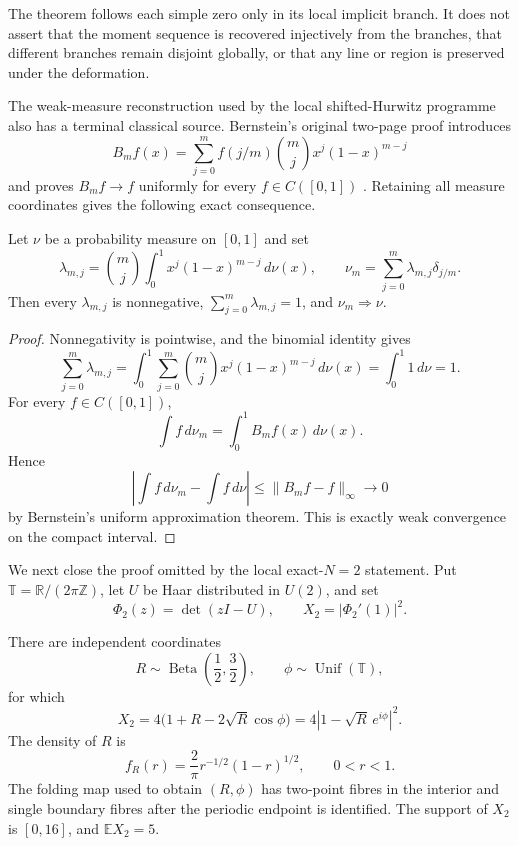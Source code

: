 The theorem follows each simple zero only in its local implicit branch.  It does not assert
that the moment sequence is recovered injectively from the branches, that different branches
remain disjoint globally, or that any line or region is preserved under the deformation.

The weak-measure reconstruction used by the local shifted-Hurwitz programme also has a
terminal classical source.  Bernstein's original two-page proof introduces
\[
 B_mf(x)=\sum_{j=0}^{m}f(j/m)\binom mjx^j(1-x)^{m-j}
\]
and proves $B_mf\to f$ uniformly for every $f\in C([0,1])$
\cite[eqs.~(1)--(5)]{bernstein1912}.  Retaining all measure coordinates gives the following
exact consequence.

\begin{proposition}
\label{prop:bernstein-measure-reconstruction}
Let $\nu$ be a probability measure on $[0,1]$ and set
\[
 \lambda_{m,j}=\binom mj\int_0^1x^j(1-x)^{m-j}\,d\nu(x),
 \qquad
 \nu_m=\sum_{j=0}^{m}\lambda_{m,j}\delta_{j/m}.
\]
Then every $\lambda_{m,j}$ is nonnegative,
$\sum_{j=0}^{m}\lambda_{m,j}=1$, and $\nu_m\Rightarrow\nu$.
\end{proposition}
\begin{proof}
Nonnegativity is pointwise, and the binomial identity gives
\[
 \sum_{j=0}^{m}\lambda_{m,j}
 =\int_0^1\sum_{j=0}^{m}\binom mjx^j(1-x)^{m-j}\,d\nu(x)
 =\int_0^1 1\,d\nu=1.
\]
For every $f\in C([0,1])$,
\[
 \int f\,d\nu_m
 =\int_0^1 B_mf(x)\,d\nu(x).
\]
Hence
\[
 \left|\int f\,d\nu_m-\int f\,d\nu\right|
 \le \lVert B_mf-f\rVert_\infty\longrightarrow0
\]
by Bernstein's uniform approximation theorem.  This is exactly weak convergence on the
compact interval.
\end{proof}

We next close the proof omitted by the local exact-$N=2$ statement.  Put
$\mathbb T=\mathbb R/(2\pi\mathbb Z)$, let $U$ be Haar distributed in $U(2)$, and set
\[
 \Phi_2(z)=\det(zI-U),
 \qquad
 X_2=|\Phi_2'(1)|^2.
\]

\begin{theorem}
\label{thm:u2-exact-derivative-law}
There are independent coordinates
\[
 R\sim\operatorname{Beta}\!\left(\frac12,\frac32\right),
 \qquad
 \phi\sim\operatorname{Unif}(\mathbb T),
\]
for which
\begin{equation}
 X_2=4\bigl(1+R-2\sqrt R\cos\phi\bigr)
     =4\left|1-\sqrt R\,e^{i\phi}\right|^2.
 \label{eq:u2-exact-law}
\end{equation}
The density of $R$ is
\begin{equation}
 f_R(r)=\frac2\pi r^{-1/2}(1-r)^{1/2},
 \qquad 0<r<1.
 \label{eq:u2-beta-density}
\end{equation}
The folding map used to obtain $(R,\phi)$ has two-point fibres in the interior and
single boundary fibres after the periodic endpoint is identified.  The support of $X_2$ is
$[0,16]$, and $\mathbb E X_2=5$.
\end{theorem}

